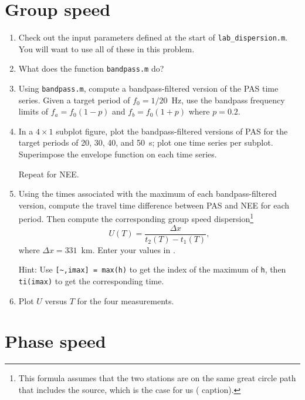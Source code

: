 \documentclass[11pt,titlepage,fleqn]{article}
\begin{document}

\section{Group speed}

\begin{enumerate}
\item Check out the input parameters defined at the start of \verb+lab_dispersion.m+. You will want to use all of these in this problem.

\item What does the function \verb+bandpass.m+ do?

\item Using \verb+bandpass.m+, compute a bandpass-filtered version of the PAS time series. Given a target period of $f_0 = 1/20$~Hz, use the bandpass frequency limits of $f_a = f_0(1-p)$ and $f_b = f_0(1+p)$ where $p = 0.2$.

\item In a $4 \times 1$ subplot figure, plot the bandpass-filtered versions of PAS for the target periods of 20, 30, 40, and 50~s; plot one time series per subplot. Superimpose the envelope function on each time series.

Repeat for NEE.

\item Using the times associated with the maximum of each bandpass-filtered version, compute the travel time difference between PAS and NEE for each period. Then compute the corresponding group speed dispersion\footnote{This formula assumes that the two stations are on the same great circle path that includes the source, which is the case for us ( caption).}
%
\begin{equation}
U(T) = \frac{\Delta x}{t_2(T) - t_1(T)},
\label{group}
\end{equation}
%
where $\Delta x = 331$~km. Enter your values in .

Hint: Use \verb+[~,imax] = max(h)+ to get the index of the maximum of \verb+h+, then \verb+ti(imax)+ to get the corresponding time.

\item Plot $U$ versus $T$ for the four measurements.
\end{enumerate}


\section{Phase speed}
\end{document}
